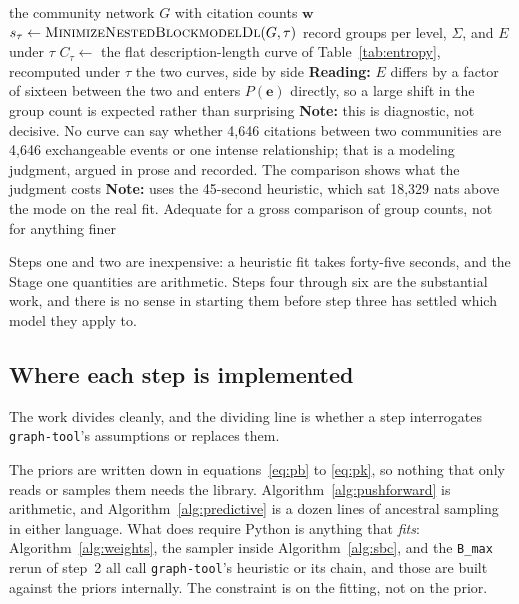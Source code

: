 \documentclass[11pt]{article}
\newcommand{\code}[1]{\texttt{\small #1}}
\begin{document}
\begin{algorithm}[!t]
\caption{Settling the likelihood. Step~1 of the order above, and a
  prerequisite for Algorithm~\ref{alg:predictive}, which is the first step
  in which $E$ enters.}
\label{alg:weights}
\begin{algorithmic}[1]
\Require the community network $G$ with citation counts $\bm{w}$
  \State $s_\tau \gets \textsc{MinimizeNestedBlockmodelDl}(G, \tau)$
  \State record groups per level, $\Sigma$, and $E$ under $\tau$
  \State $C_\tau \gets$ the flat description-length curve of
    Table~\ref{tab:entropy}, recomputed under $\tau$
\EndFor
\Ensure the two curves, side by side
\State \textbf{Reading:} $E$ differs by a factor of sixteen between the two
  and enters $P(\bm{e})$ directly, so a large shift in the group count is
  expected rather than surprising
\State \textbf{Note:} this is diagnostic, not decisive. No curve can say
  whether 4{,}646 citations between two communities are 4{,}646 exchangeable
  events or one intense relationship; that is a modeling judgment, argued in
  prose and recorded. The comparison shows what the judgment costs
\State \textbf{Note:} uses the 45-second heuristic, which sat 18{,}329 nats
  above the mode on the real fit. Adequate for a gross comparison of group
  counts, not for anything finer
\end{algorithmic}
\end{algorithm}

Steps one and two are inexpensive: a heuristic fit takes forty-five seconds,
and the Stage one quantities are arithmetic. Steps four through six are the substantial work, and there is no sense in
starting them before step three has settled which model they apply to.

\subsection{Where each step is implemented}

The work divides cleanly, and the dividing line is whether a step interrogates
\code{graph-tool}'s assumptions or replaces them.

The priors are written down in equations~\eqref{eq:pb} to \eqref{eq:pk}, so
nothing that only reads or samples them needs the library.
Algorithm~\ref{alg:pushforward} is arithmetic, and
Algorithm~\ref{alg:predictive} is a dozen lines of ancestral sampling in either
language. What does require Python is anything that \emph{fits}:
Algorithm~\ref{alg:weights}, the sampler inside Algorithm~\ref{alg:sbc}, and
the \code{B_max} rerun of step~2 all call \code{graph-tool}'s heuristic or its
chain, and those are built against the priors internally. The constraint is
on the fitting, not on the prior.
\end{document}

